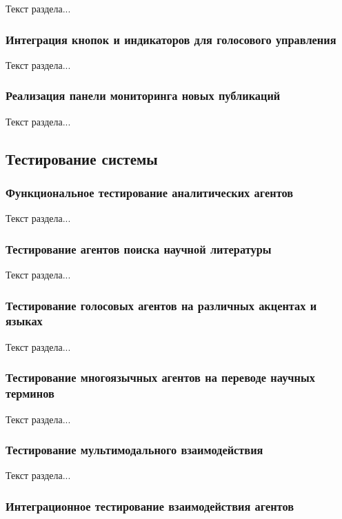 Текст раздела...

\subsubsection{Интеграция кнопок и индикаторов для голосового управления}

Текст раздела...

\subsubsection{Реализация панели мониторинга новых публикаций}

Текст раздела...

\subsection{Тестирование системы}

\subsubsection{Функциональное тестирование аналитических агентов}

Текст раздела...

\subsubsection{Тестирование агентов поиска научной литературы}

Текст раздела...

\subsubsection{Тестирование голосовых агентов на различных акцентах и языках}

Текст раздела...

\subsubsection{Тестирование многоязычных агентов на переводе научных терминов}

Текст раздела...

\subsubsection{Тестирование мультимодального взаимодействия}

Текст раздела...

\subsubsection{Интеграционное тестирование взаимодействия агентов}

